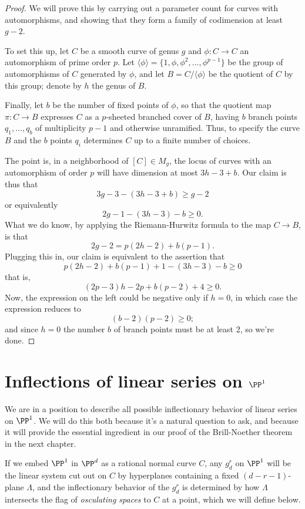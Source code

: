 \begin{proof}
We will prove this by carrying out a parameter count for curves with automorphisms, and showing that they form a family of codimension at least $g-2$.

To set this up, let $C$ be a smooth curve of genus $g$ and $\phi : C \to C$ an automorphism of prime order $p$. Let $\langle \phi \rangle = \{1, \phi, \phi^2,\dots,\phi^{p-1} \}$ be the group of automorphisms of $C$ generated by $\phi$, and let $B = C/\langle \phi \rangle $ be the quotient of $C$ by this group; denote by $h$ the genus of $B$.

Finally, let $b$ be the number of fixed points of $\phi$, so that the quotient map $\pi : C \to B$ expresses $C$ as a $p$-sheeted branched cover of $B$, having $b$ branch points $q_1,\dots, q_b$ of multiplicity $p-1$ and otherwise unramified. Thus, to specify the curve $B$ and the $b$ points $q_i$ determines $C$ up to a finite number of choices. 

The point is, in a neighborhood of $[C] \in M_g$, the locus of curves with an automorphism of order $p$ will have dimension at most $3h-3 + b$. Our claim is thus that
$$
3g-3 - (3h-3+b) \geq g-2
$$
or equivalently
$$
2g - 1 - (3h-3) - b \geq 0.
$$
What we do know, by applying the Riemann-Hurwitz formula to the map $C \to B$, is that
$$
2g-2 = p(2h-2) + b(p-1).
$$
Plugging this in, our claim is equivalent to the assertion that
$$
p(2h-2) + b(p-1) + 1 - (3h-3) - b \geq 0
$$
that is,
$$
(2p-3)h -2p + b(p-2) + 4 \geq 0.
$$
Now, the expression on the left could be negative only if $h=0$, in which case the expression reduces to
$$
(b-2)(p-2) \geq 0;
$$
and since $h=0$ the number $b$ of branch points must be at least 2, so we're done.
\end{proof}

\section{Inflections of linear series on $\PP^1$}

We are in a position to describe all possible inflectionary behavior of linear series on $\PP^1$. We will do this both because it's a natural question to ask, and because it will provide the essential ingredient in our proof of the Brill-Noether theorem in the next chapter.

If we embed $\PP^1$ in $\PP^d$ as a rational normal curve $C$, any $g^r_d$ on $\PP^1$ will be the linear system cut out on $C$ by hyperplanes containing a fixed $(d-r-1)$-plane $\Lambda$, and the inflectionary behavior of the $g^r_d$ is determined by how $\Lambda$ intersects the flag of \emph{osculating spaces}  to $C$ at a point, which we will define below. 

